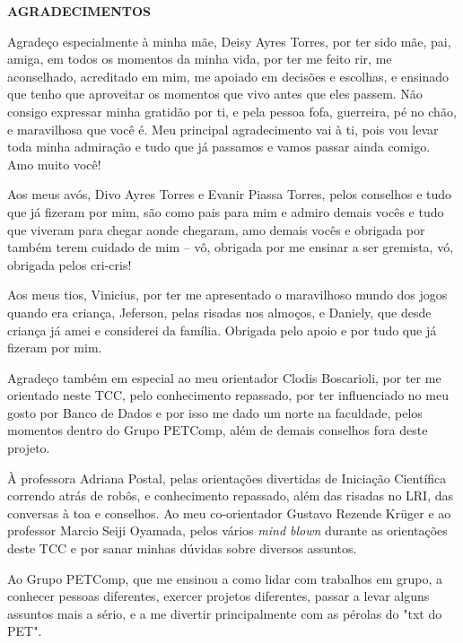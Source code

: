 
\begin{center}
\fontsize{14}{14}
\textbf{AGRADECIMENTOS}
\end{center}
\vspace{2cm}

Agradeço especialmente à minha mãe, Deisy Ayres Torres, por ter sido mãe, pai, amiga, em todos os momentos da minha vida, por ter me feito rir, me aconselhado, acreditado em mim, me apoiado em decisões e escolhas, e ensinado que tenho que aproveitar os momentos que vivo antes que eles passem. Não consigo expressar minha gratidão por ti, e pela pessoa fofa, guerreira, pé no chão, e maravilhosa que você é. Meu principal agradecimento vai à ti, pois vou levar toda minha admiração e tudo que já passamos e vamos passar ainda comigo. Amo muito você!

Aos meus avós, Divo Ayres Torres e Evanir Piassa Torres, pelos conselhos e tudo que já fizeram por mim, são como pais para mim e admiro demais vocês e tudo que viveram para chegar aonde chegaram, amo demais vocês e obrigada por também terem cuidado de mim -- vô, obrigada por me ensinar a ser gremista, vó, obrigada pelos cri-cris!

Aos meus tios, Vinicius, por ter me apresentado o maravilhoso mundo dos jogos quando era criança, Jeferson, pelas risadas nos almoços, e Daniely, que desde criança já amei e considerei da família. Obrigada pelo apoio e por tudo que já fizeram por mim.

Agradeço também em especial ao meu orientador Clodis Boscarioli, por ter me orientado neste TCC, pelo conhecimento repassado, por ter influenciado no meu gosto por Banco de Dados e por isso me dado um norte na faculdade, pelos momentos dentro do Grupo PETComp, além de demais conselhos fora deste projeto.

À professora Adriana Postal, pelas orientações divertidas de Iniciação Científica correndo atrás de robôs, e conhecimento repassado, além das risadas no LRI, das conversas à toa e conselhos. Ao meu co-orientador Gustavo Rezende Krüger e ao professor Marcio Seiji Oyamada, pelos vários \textit{mind blown} durante as orientações deste TCC e por sanar minhas dúvidas sobre diversos assuntos. 

Ao Grupo PETComp, que me ensinou a como lidar com trabalhos em grupo, a conhecer pessoas diferentes, exercer projetos diferentes, passar a levar alguns assuntos mais a sério, e a me divertir principalmente com as pérolas do "txt do PET".

